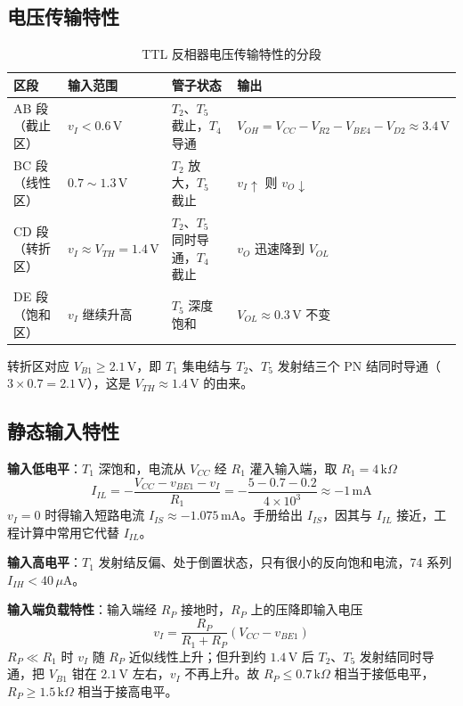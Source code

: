 \subsection{电压传输特性}
\begin{table}[!htbp]
    \centering
    \caption{TTL 反相器电压传输特性的分段}
    \small
    \begin{tabular}{llll}
        \toprule
        区段 & 输入范围 & 管子状态 & 输出 \\
        \midrule
        AB 段（截止区） & \(v_I<0.6\,\mathrm{V}\) & \(T_2\)、\(T_5\) 截止，\(T_4\) 导通 & \(V_{OH}=V_{CC}-V_{R2}-V_{BE4}-V_{D2}\approx3.4\,\mathrm{V}\) \\
        BC 段（线性区） & \(0.7\sim1.3\,\mathrm{V}\) & \(T_2\) 放大，\(T_5\) 截止 & \(v_I\uparrow\) 则 \(v_O\downarrow\) \\
        CD 段（转折区） & \(v_I\approx V_{TH}=1.4\,\mathrm{V}\) & \(T_2\)、\(T_5\) 同时导通，\(T_4\) 截止 & \(v_O\) 迅速降到 \(V_{OL}\) \\
        DE 段（饱和区） & \(v_I\) 继续升高 & \(T_5\) 深度饱和 & \(V_{OL}\approx0.3\,\mathrm{V}\) 不变 \\
        \bottomrule
    \end{tabular}
\end{table}
转折区对应 \(V_{B1}\ge2.1\,\mathrm{V}\)，即 \(T_1\) 集电结与 \(T_2\)、\(T_5\) 发射结三个 PN 结同时导通（\(3\times0.7=2.1\,\mathrm{V}\)），这是 \(V_{TH}\approx1.4\,\mathrm{V}\) 的由来。

\subsection{静态输入特性}
\textbf{输入低电平}：\(T_1\) 深饱和，电流从 \(V_{CC}\) 经 \(R_1\) 灌入输入端，取 \(R_1=4\,\mathrm{k}\Omega\)
\[
I_{IL}=-\frac{V_{CC}-v_{BE1}-v_I}{R_1}=-\frac{5-0.7-0.2}{4\times10^{3}}\approx-1\,\mathrm{mA}
\]
\(v_I=0\) 时得输入短路电流 \(I_{IS}\approx-1.075\,\mathrm{mA}\)。手册给出 \(I_{IS}\)，因其与 \(I_{IL}\) 接近，工程计算中常用它代替 \(I_{IL}\)。

\textbf{输入高电平}：\(T_1\) 发射结反偏、处于倒置状态，只有很小的反向饱和电流，74 系列 \(I_{IH}<40\,\mu\mathrm{A}\)。

\textbf{输入端负载特性}：输入端经 \(R_P\) 接地时，\(R_P\) 上的压降即输入电压
\[
v_I=\frac{R_P}{R_1+R_P}\left(V_{CC}-v_{BE1}\right)
\]
\(R_P\ll R_1\) 时 \(v_I\) 随 \(R_P\) 近似线性上升；但升到约 \(1.4\,\mathrm{V}\) 后 \(T_2\)、\(T_5\) 发射结同时导通，把 \(V_{B1}\) 钳在 \(2.1\,\mathrm{V}\) 左右，\(v_I\) 不再上升。故 \(R_P\le0.7\,\mathrm{k}\Omega\) 相当于接低电平，\(R_P\ge1.5\,\mathrm{k}\Omega\) 相当于接高电平。

